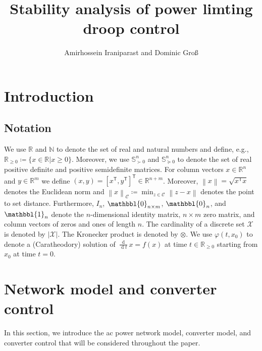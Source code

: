 \documentclass[twocolumn,twoside,journal]{IEEEtran}
\title{\LARGE \bf  Stability analysis of power limting droop control}
\author{Amirhossein Iraniparast and Dominic Gro\ss}
\DeclareMathOperator{\diff}{d}
\newcommand{\mc}{\mathcal}
\newcommand{\ddt}{\tfrac{\diff}{\diff \!t}}
\newcommand{\norm}[1]{\left \lVert #1 \right \rVert}
\begin{document}
\maketitle

\begin{abstract} 
\end{abstract}
\section{Introduction}


\subsection*{Notation}
We use $\mathbb{R}$ and $\mathbb N$ to denote the set of real and natural numbers and define, e.g., $\mathbb{R}_{\geq 0}\coloneqq \{x \in \mathbb R \vert x \geq 0\}$. Moreover, we use $\mathbb{S}_{\succ 0}^n$ and $\mathbb{S}_{\succeq 0}^n$ to denote the set of real positive definite and positive semidefinite matrices. For column vectors $x\in\mathbb{R}^n$ and $y\in\mathbb{R}^m$ we define $(x,y) = [x^\mathsf{T}, y^\mathsf{T}]^\mathsf{T} \in \mathbb{R}^{n+m}$. Moreover, $\norm{x}=\sqrt{x^\mathsf{T} x}$ denotes the Euclidean norm and $\norm{x}_{\mc C} \coloneqq \min_{z\in\mc C} \norm{z-x}$ denotes the point to set distance. Furthermore, $I_n$, $\mathbbl{0}_{n\times m}$, $\mathbbl{0}_{n}$, and $\mathbbl{1}_n$ denote the $n$-dimensional identity matrix, $n \times m$ zero matrix, and column vectors of zeros and ones of length $n$. The cardinality of a discrete set $\mc X$ is denoted by $|\mc X|$. The Kronecker product is denoted by $\otimes$. We use $\varphi(t,x_0)$ to denote a (Caratheodory) solution of $\ddt x = f(x)$ at time $t \in \mathbb{R}_{\geq 0}$ starting from $x_0$ at time $t=0$.

\section{Network model and converter control}
    In this section, we introduce the ac power network model, converter model, and converter control that will be considered throughout the paper.
\end{document}
